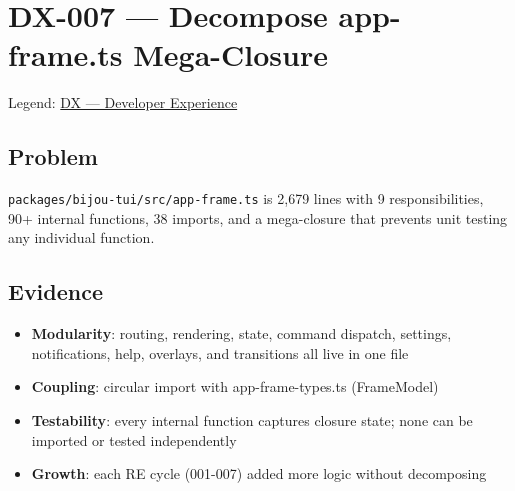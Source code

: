 \chapter{DX-007 --- Decompose app-frame.ts Mega-Closure}\label{record-306}

\smallskip

Legend: \href{https://github.com/flyingrobots/bijou/blob/cbd70612140e7a450d764b3c7be1c6af878b99bc/docs/method/graveyard/legends/DX-developer-experience.md}{DX --- Developer Experience}

\section{Problem}\label{record-306-problem}

\texttt{p\allowbreak{}a\allowbreak{}c\allowbreak{}k\allowbreak{}a\allowbreak{}g\allowbreak{}e\allowbreak{}s\allowbreak{}/\allowbreak{}b\allowbreak{}i\allowbreak{}j\allowbreak{}o\allowbreak{}u\allowbreak{}-\allowbreak{}t\allowbreak{}u\allowbreak{}i\allowbreak{}/\allowbreak{}s\allowbreak{}r\allowbreak{}c\allowbreak{}/\allowbreak{}a\allowbreak{}p\allowbreak{}p\allowbreak{}-\allowbreak{}f\allowbreak{}r\allowbreak{}a\allowbreak{}m\allowbreak{}e\allowbreak{}.\allowbreak{}t\allowbreak{}s} is 2,679 lines with 9 responsibilities, 90+ internal functions, 38 imports, and a mega-closure that prevents unit testing any individual function.

\section{Evidence}\label{record-306-evidence}

\begin{itemize}
\tightlist
\item
  \textbf{Modularity}: routing, rendering, state, command dispatch, settings, notifications, help, overlays, and transitions all live in one file
\item
  \textbf{Coupling}: circular import with app-frame-types.ts (FrameModel)
\item
  \textbf{Testability}: every internal function captures closure state; none can be imported or tested independently
\item
  \textbf{Growth}: each RE cycle (001-007) added more logic without decomposing
\end{itemize}

